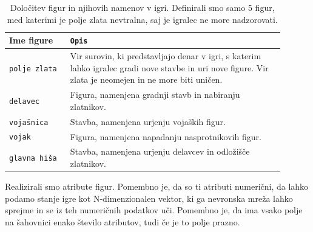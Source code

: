 \documentclass[a4paper, 12pt]{book}
\begin{document}
{\begin{table}
	\begin{center}
		\begin{tabular}{p{0.2\linewidth}|p{0.7\linewidth}}
			Ime figure        & {\tt Opis} \\ \hline
			{\tt polje zlata} & Vir surovin, ki predstavljajo denar v igri, s katerim lahko igralec gradi nove stavbe in uri nove figure. 
								Vir zlata je neomejen in ne more biti uničen. \\
			{\tt delavec}     & Figura, namenjena gradnji stavb in nabiranju zlatnikov. \\
			{\tt vojašnica}   & Stavba, namenjena urjenju vojaških figur. \\
			{\tt vojak}       & Figura, namenjena napadanju nasprotnikovih figur. \\
			{\tt glavna hiša} & Stavba, namenjena urjenju delavcev in odložišče zlatnikov. \\
		\end{tabular}
	\end{center}
	\caption{Določitev figur in njihovih namenov v igri. Definirali smo samo 5 figur, med katerimi je polje zlata nevtralna, saj je igralec ne more nadzorovati. }
	\label{tableFiguresDescription}
\end{table}

Realizirali smo atribute figur. 
Pomembno je, da so ti atributi numerični, da lahko podamo stanje igre kot N-dimenzionalen vektor, ki ga nevronska mreža lahko sprejme in se iz teh numeričnih podatkov uči.
Pomembno je, da ima vsako polje na šahovnici enako število atributov, tudi če je to polje prazno.

}
\end{document}
